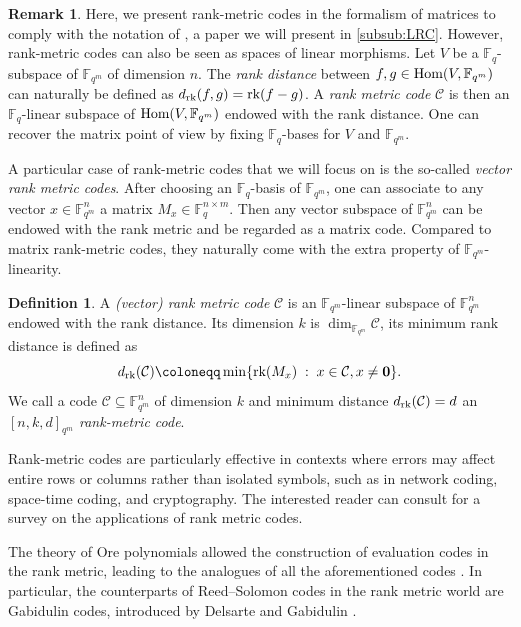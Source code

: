 \documentclass[11pt]{article}
\theoremstyle{definition}
\newtheorem{definition}[theorem]{Definition}
\newtheorem{remark}[theorem]{Remark}
\newcommand\F{\mathbb{F}}
\newcommand\Fq{\mathbb{F}_q}
\newcommand\Fqm{\F_{q^m}}
\newcommand{\Hom}{\text{\rm Hom}}
\newcommand\rk{\text{\rm rk}}
\begin{document}
\begin{remark}
Here, we present rank-metric codes in the formalism of matrices to comply with the notation of \cite{BDM24preprint}, a paper we will present in \cref{subsub:LRC}. However, rank-metric codes can also be seen as spaces of linear morphisms. Let $V$ be a $\Fq$-subspace of $\Fqm$ of dimension $n$. The \emph{rank distance} between ${f,g\in\Hom(V,\Fqm)}$ can naturally  be defined as 
$d_\rk(f,g)=\rk(f-g)$.
A \emph{rank metric code} $\mathcal{C}$ is then an $\Fq$-linear subspace of $\Hom(V,\Fqm)$ endowed with the rank distance. One can recover the matrix point of view by fixing $\Fq$-bases for $V$ and $\Fqm$.
\end{remark}

A particular case of rank-metric codes that we will focus on is the so-called \emph{vector rank metric codes}. After choosing an $\Fq$-basis of $\Fqm$, one can associate to any vector $x\in\Fqm^n$ a matrix $M_x\in\Fq^{n\times m}$. Then any vector subspace of $\Fqm^n$ can be endowed with the rank metric and be regarded as a matrix code. Compared to matrix rank-metric codes, they naturally come with the extra property of $\Fqm$-linearity.
\begin{definition}
    A \emph{(vector) rank metric code} $\mathcal{C}$ is an $\Fqm$-linear subspace of $\Fqm^{n}$ endowed with the rank distance. Its dimension $k$ is  $\dim_{\Fqm} \mathcal{C}$, its minimum rank distance is defined as 
\[d_\rk(\mathcal{C})\coloneqq
\min\{\rk(M_x)\;:\; x\in\mathcal{C},x\neq \boldsymbol{0}\}.\]
We call a code $\mathcal{C}\subseteq \Fqm^n$ of dimension $k$ and minimum distance $d_\rk(\mathcal{C})=d$ an \emph{$[n,k,d]_{q^m}$ rank-metric code}. 
\end{definition}

Rank-metric codes are particularly effective in contexts where errors may affect entire rows or columns rather than isolated symbols, such as in network coding, space-time coding, and cryptography. The interested reader can consult \cite{bartz2022rank} for a survey on the applications of rank metric codes.
\smallskip

The theory of Ore polynomials allowed the construction of evaluation codes in the rank metric, leading to the analogues of all the aforementioned codes \cite{Delsarte,ALG18,ACLN21,BC25,BC24}. In particular, the counterparts of Reed--Solomon codes in the rank metric world are Gabidulin codes, introduced by Delsarte \cite{Delsarte} and Gabidulin \cite{Gabidulin}.
\end{document}
